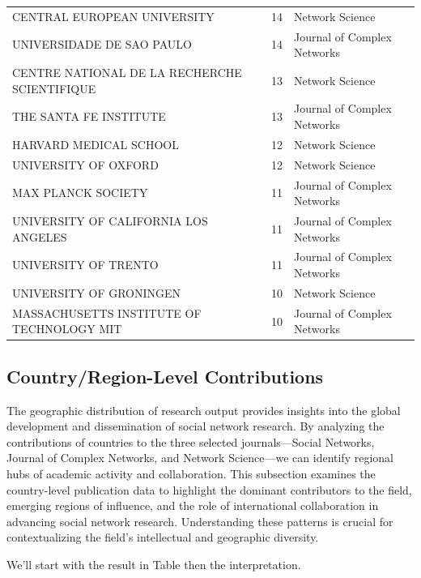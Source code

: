 \documentclass[twocolumn]{article}
\begin{document}
\begin{table}[htbp]
{\begin{tabular}{lcl}
				CENTRAL EUROPEAN UNIVERSITY                   & 14 & Network Science \\
				UNIVERSIDADE DE SAO PAULO                     & 14 & Journal of Complex Networks \\
				CENTRE NATIONAL DE LA RECHERCHE SCIENTIFIQUE  & 13 & Network Science \\
				THE SANTA FE INSTITUTE                        & 13 & Journal of Complex Networks \\
				HARVARD MEDICAL SCHOOL                        & 12 & Network Science \\
				UNIVERSITY OF OXFORD                          & 12 & Network Science \\
				MAX PLANCK SOCIETY                            & 11 & Journal of Complex Networks \\
				UNIVERSITY OF CALIFORNIA LOS ANGELES          & 11 & Journal of Complex Networks \\
				UNIVERSITY OF TRENTO                          & 11 & Journal of Complex Networks \\
				UNIVERSITY OF GRONINGEN                       & 10 & Network Science \\
				MASSACHUSETTS INSTITUTE OF TECHNOLOGY MIT     & 10 & Journal of Complex Networks \\
				\bottomrule
		\end{tabular}}
	\end{table}

	
	
	\subsection{Country/Region-Level Contributions}
	
	The geographic distribution of research output provides insights into the global development and dissemination of social network research. By analyzing the contributions of countries to the three selected journals—Social Networks, Journal of Complex Networks, and Network Science—we can identify regional hubs of academic activity and collaboration. This subsection examines the country-level publication data to highlight the dominant contributors to the field, emerging regions of influence, and the role of international collaboration in advancing social network research. Understanding these patterns is crucial for contextualizing the field's intellectual and geographic diversity.
	
	We'll start with the result in Table then the interpretation.
	
	
	
	
\end{document}
